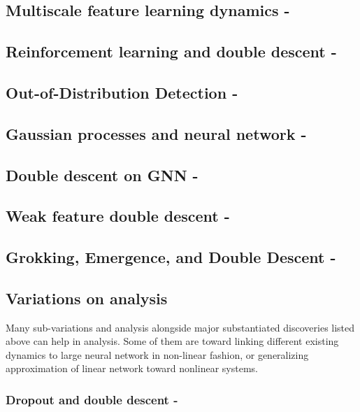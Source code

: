 \documentclass[
  journal=largetwo,
  year=2025,
  volume=37,
]{cup-journal}
\begin{document}
\subsection{Multiscale feature learning dynamics - \cite{pezeshki2021multiscalefeaturelearningdynamics}}


\subsection{Reinforcement learning and double descent - \cite{brellmann2024on}}


\subsection{Out-of-Distribution Detection - \cite{ammar2025doubledescentmeetsoutofdistribution}}


\subsection{Gaussian processes and neural network - \cite{harzli2023doubledescentcurvesneuralnetworks}}


\subsection{Double descent on GNN - \cite{shi2024homophilymodulatesdoubledescent}}


\subsection{Weak feature double descent - \cite{Belkin_2020}}


\subsection{Grokking, Emergence, and Double Descent - ~\cite{huang2025samplecomplexityrepresentationability}}

\subsection{Variations on analysis}
Many sub-variations and analysis alongside major substantiated discoveries listed above can help in analysis. Some of them are toward linking different existing dynamics to large neural network in non-linear fashion, or generalizing approximation of linear network toward nonlinear systems. 
\subsubsection{Dropout and double descent - \cite{Yang_2024}}
\end{document}
